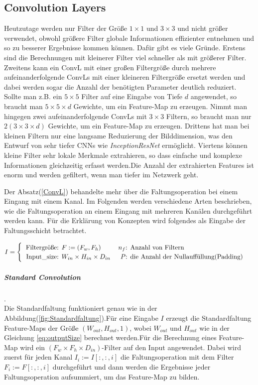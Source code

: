 \documentclass[12pt,a4paper]{scrartcl}
\numberwithin{equation}{section}
\begin{document}
\subsection{Convolution Layers}
Heutzutage werden nur Filter der Größe $ 1\times 1 $ und $ 3\times 3 $ und nicht größer verwendet, obwohl größere Filter globale Informationen effizienter entnehmen und so zu besserer Ergebnisse kommen können. Dafür gibt es viele Gründe. Erstens sind die Berechnungen mit kleinerer Filter viel schneller als mit größerer Filter. Zweitens kann ein \ac{ConvL} mit einer großen Filtergröße durch mehrere aufeinanderfolgende \acsp{ConvL} mit einer kleineren Filtergröße ersetzt werden und dabei werden sogar die Anzahl der benötigten Parameter deutlich reduziert. Sollte man z.B. ein $ 5\times 5 $ Filter auf eine Eingabe von Tiefe $ d $ angewendet, so braucht man $ 5\times 5\times d $ Gewichte, um ein Feature-Map zu erzeugen. Nimmt man hingegen zwei aufeinanderfolgende \acsp{ConvL} mit $ 3\times 3$ Filtern, so braucht man nur $ 2(3\times 3\times d) $ Gewichte, um ein Feature-Map zu erzeugen. Drittens hat man bei kleinen Filtern nur eine langsame Reduzierung der Bilddimension, was den Entwurf von sehr tiefer \ac{CNN}s wie \textit{InceptionResNet} ermöglicht. Viertens können kleine Filter sehr lokale Merkmale extrahieren, so dass einfache und komplexe Informationen gleichzeitig erfasst werden.Die Anzahl der extrahierten Features ist enorm und werden gefiltert, wenn man tiefer im Netzwerk geht.

Der Absatz(\ref{ConvL}) behandelte mehr über die Faltungsoperation bei einem Eingang mit einem Kanal. Im Folgenden werden verschiedene Arten beschrieben, wie die Faltungsoperation an einem Eingang mit mehreren Kanälen durchgeführt werden kann. Für die Erklärung von Konzepten wird folgendes als Eingabe der Faltungsschicht betrachtet.

 \[ I=\begin{cases}

 \begin{tabular}{r@{: }l r@{: }l}
 Filtergröße& $ F:=(F_w, F_h) $  & 	$ n_{f}$& Anzahl von Filtern\\
 Input\_{size}& $ W_{in}\times H_{in}\times D_{in} $ & $ P $ & die Anzahl der Nullauffüllung(Padding)
 \end{tabular}
 
 \end{cases}\]


\subparagraph{Standard Convolution}.\\
Die Standardfaltung funktioniert genau wie in der Abbildung(\ref{fig:Standardfaltung}).Für eine Eingabe $ I $ erzeugt die Standardfaltung Feature-Maps der Größe $(W_{out},H_{out}, 1) $, wobei $W_{out} $ und $H_{out} $ wie in der Gleichung \ref{eq:outputSize} berechnet werden.Für die Berechnung eines Feature-Map wird ein $ (F_w\times F_h\times D_{in}) $-Filter auf den Input angewendet. Dabei wird zuerst für jeden Kanal $ I_i :=I[:,:, i]$ die Faltungsoperation mit dem Filter $ F_i := F[:,:,i] $ durchgeführt und dann werden die Ergebnisse jeder Faltungsoperation aufsummiert, um das Feature-Map zu bilden.
\end{document}
